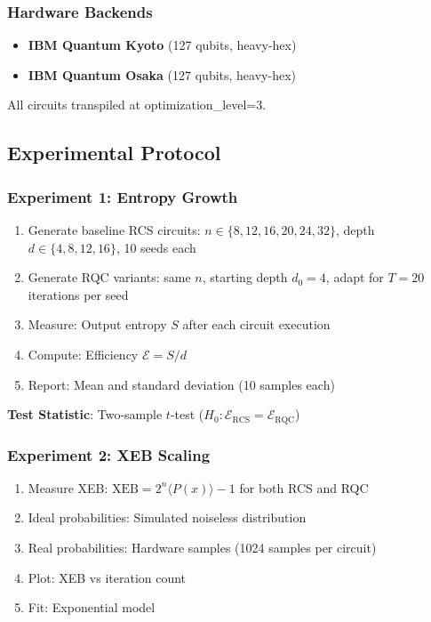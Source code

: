 \documentclass[twocolumn]{article}
\begin{document}
\subsubsection{Hardware Backends}

\begin{itemize}
\item \textbf{IBM Quantum Kyoto} (127 qubits, heavy-hex)
\item \textbf{IBM Quantum Osaka} (127 qubits, heavy-hex)
\end{itemize}

All circuits transpiled at optimization\_level=3.

\subsection{Experimental Protocol}

\subsubsection{Experiment 1: Entropy Growth}

\begin{enumerate}
\item Generate baseline RCS circuits: $n \in \{8, 12, 16, 20, 24, 32\}$, depth $d \in \{4, 8, 12, 16\}$, 10 seeds each
\item Generate RQC variants: same $n$, starting depth $d_0 = 4$, adapt for $T = 20$ iterations per seed
\item Measure: Output entropy $S$ after each circuit execution
\item Compute: Efficiency $\mathcal{E} = S / d$
\item Report: Mean and standard deviation (10 samples each)
\end{enumerate}

\textbf{Test Statistic}: Two-sample $t$-test ($H_0: \mathcal{E}_{\text{RCS}} = \mathcal{E}_{\text{RQC}}$)

\subsubsection{Experiment 2: XEB Scaling}

\begin{enumerate}
\item Measure XEB: $\text{XEB} = 2^n \langle P(x) \rangle - 1$ for both RCS and RQC
\item Ideal probabilities: Simulated noiseless distribution
\item Real probabilities: Hardware samples (1024 samples per circuit)
\item Plot: XEB vs iteration count
\item Fit: Exponential model
\end{enumerate}
\end{document}
